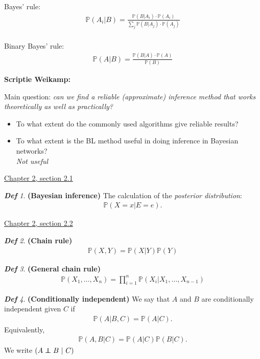 \documentclass{amsart}
\newcommand\indep{\protect\mathpalette{\protect\independenT}{\perp}}
\def\independenT#1#2{\mathrel{\rlap{$#1#2$}\mkern2mu{#1#2}}}
\theoremstyle{plain}
\theoremstyle{remark}
\newtheorem*{definition*}{\textbf{\em Def}}
\theoremstyle{plain}
\renewcommand{\P}{{\mathbb P}}
\newcommand{\vs}{\vspace{0.75pc}}
\begin{document}
Bayes' rule:
\begin{align*}
\P(A_i|B) = \frac{\P(B|A_i) \cdot \P(A_i)}{\sum_j \P(B|A_j) \cdot \P(A_j)}
\end{align*}\\
Binary Bayes' rule:
\begin{align*}
\P(A|B) = \frac{\P(B|A) \cdot \P(A)}{ \P(B)}
\end{align*} \vs

\textbf{Scriptie Weikamp:}\vs

Main question: \textit{can we find a reliable (approximate) inference method that works theoretically as well as practically?} \\
\begin{itemize}
\item To what extent do the commonly used algorithms give reliable results?
\item To what extent is the BL method useful in doing inference in Bayesian networks? \\ \textit{Not useful}
\end{itemize}\vs

\underline{Chapter 2, section 2.1} \vs

\begin{definition*}\textbf{(Bayesian inference)}
The calculation of the \textit{posterior distribution}:
\begin{align*}
\P(X = x | E = e).
\end{align*}
\end{definition*}\vs

\underline{Chapter 2, section 2.2} \\
\begin{definition*}\textbf{(Chain rule)}
\begin{align*}
\P(X, Y) = \P(X | Y) \P(Y)
\end{align*}
\end{definition*}\vs

\begin{definition*}\textbf{ (General chain rule) }
\begin{align*}
\P(X_1, \ldots, X_n) = \prod_{i=1}^n \P(X_i | X_1, \ldots , X_{n-1})
\end{align*}
\end{definition*}\vs

\begin{definition*}\textbf{(Conditionally independent)}
We say that $A$ and $B$ are conditionally independent given $C$ if
\begin{align*}
\P(A | B,C) = \P(A | C).
\end{align*}
Equivalently,
\begin{align*}
\P(A, B | C) = \P(A | C)\P(B| C).
\end{align*}
We write $(A \indep B\ |\ C)$
\end{definition*}\vs
\end{document}
